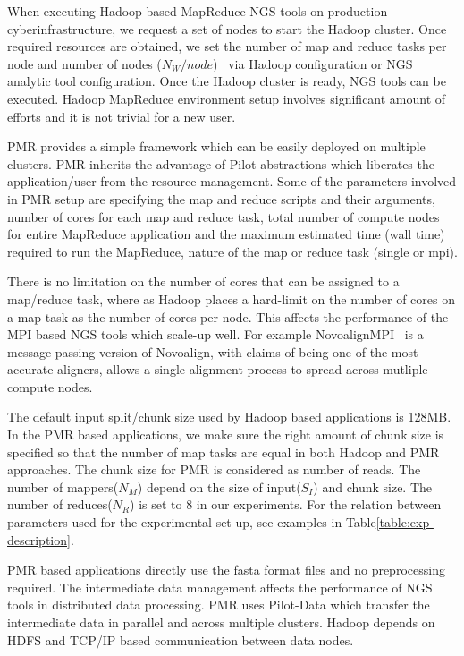 \documentclass{acm_proc_article-sp}
\begin{document}
When executing Hadoop based MapReduce NGS tools on production
cyberinfrastructure, we request a set of nodes to start the Hadoop
cluster. Once required resources are obtained, we set the number of
map and reduce tasks per node and number of nodes
($N_{W}/node$)~ via Hadoop
configuration or NGS analytic tool configuration.  Once the Hadoop
cluster is ready, NGS tools can be executed. Hadoop MapReduce
environment setup involves significant amount of efforts and it is not
trivial for a new user.

PMR provides a simple framework which can be easily deployed on
multiple clusters. PMR inherits the advantage of Pilot abstractions
which liberates the application/user from the resource
management. Some of the parameters involved in PMR setup are
specifying the map and reduce scripts and their arguments, number of
cores for each map and reduce task, total number of compute nodes for
entire MapReduce application and the maximum estimated time (wall
time) required to run the MapReduce, nature of the map or reduce task
(single or mpi).

There is no limitation on the number of cores that can be assigned to
a map/reduce task, where as Hadoop places a hard-limit on the number
of cores on a map task as the number of cores per node. This affects
the performance of the MPI based NGS tools which scale-up well. For
example NovoalignMPI~\cite{novo-align} is a message passing version of
Novoalign, with claims of being one of the most accurate aligners,
allows a single alignment process to spread across mutliple compute
nodes.

The default input split/chunk size used by Hadoop based applications
is 128MB. In the PMR based applications, we make sure the right amount
of chunk size is specified so that the number of map tasks are equal
in both Hadoop and PMR approaches. The chunk size for PMR is
considered as number of reads. The number of mappers($N_M$) depend on
the size of input($S_I$) and chunk size. The number of reduces($N_R$)
is set to 8 in our experiments. For the relation between parameters
used for the experimental set-up, see examples in
Table\ref{table:exp-description}.

PMR based applications directly use the fasta format files and no
preprocessing required.  The intermediate data management affects the
performance of NGS tools in distributed data processing. PMR uses
Pilot-Data which transfer the intermediate data in parallel and across
multiple clusters. Hadoop depends on HDFS and TCP/IP based
communication between data nodes.
\end{document}

